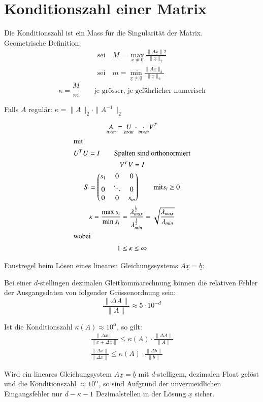 \section{Konditionszahl einer Matrix}
Die Konditionszahl ist ein Mass f\"ur die Singularit\"at der Matrix. \\

Geometrische Definition:
\begin{gather}
  \text{sei}\quad M = \max_{\underline{x}\neq\underline{0}}\frac{\|A\underline{x}\|2}{\|\underline{x}\|_2} \\
  \text{sei}\quad m = \min_{\underline{x}\neq\underline{0}}\frac{\|A\underline{x}\|_2}{\|\underline{x}\|_2}
\end{gather}
\begin{equation}
  \kappa = \frac{M}{m} \qquad\text{je gr\"osser, je gef\"ahrlicher numerisch}
\end{equation}

Falls $A$ regul\"ar: $\kappa = \|A\|_2 \cdot \|A^{-1}\|_2$

\begin{gather}
  \underset{n\times m}{A} = \underset{n\times m}{U}\cdot\underset{m\times m}\cdot V^T \\
  \intertext{mit}
  U^TU = I \qquad\text{Spalten sind orthonormiert} \\
  V^TV = I \\
  S = \begin{pmatrix}
		s_1 & 0      & 0 \\
		0   & \ddots & 0 \\
		0   & 0      & s_m
	\end{pmatrix} \qquad\text{mit} s_i \geq 0 \\
  \kappa = \frac{\max s_i}{\min s_i} = \frac{\lambda_{max}^{\frac{1}{2}}}{\lambda_{min}^{\frac{1}{2}}} =
	\sqrt{\frac{\lambda_{max}}{\lambda_{min}}} \\
  \intertext{wobei}
  1 \leq \kappa \leq \infty
\end{gather}

Faustregel beim L\"osen eines linearen Gleichungssystems $A\underline{x}=\underline{b}$:

Bei einer $d$-stellingen dezimalen Gleitkommarechnung k\"onnen die relativen Fehler der Ausgangsdaten von folgender Gr\"ossenordnung sein:
\begin{equation}
  \frac{\|\Delta A\|}{\|A\|} \approx 5\cdot 10^{-d}
\end{equation}

Ist die Konditionszahl $\kappa (A) \approx 10^\alpha$, so gilt:
\begin{gather}
  \frac{\|\Delta x\|}{\|x+\Delta x\|} \leq \kappa (A) \cdot \frac{\|\Delta A\|}{\|A\|} \\
  \frac{\|\Delta x\|}{\|\Delta x\|} \leq \kappa (A)\cdot\frac{\|\Delta b\|}{\|b\|}
\end{gather}

Wird ein lineares Gleichungsystem $A\underline{x}=\underline{b}$ mit $d$-stelligem, dezimalen Float gel\"ost und die Konditionszahl $\approx 10^\alpha$, so sind Aufgrund der unvermeidlichen Eingangsfehler nur $d-\kappa -1$ Dezimalstellen in der L\"osung $\underline{x}$ sicher.

%
%
